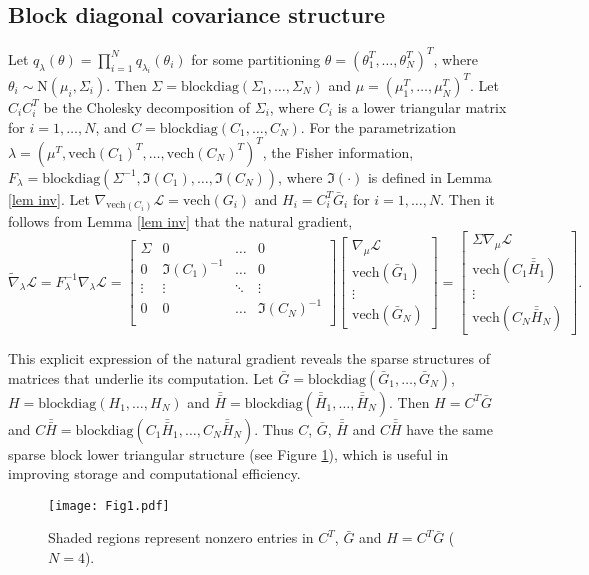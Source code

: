 \documentclass{statsoc}
\newcommand\blockdiag{{\text{blockdiag}}}
\newcommand\mL{{\mathcal{L}}}
\newcommand\N{{\text{N}}}
\newcommand{\vech}{\text{vech}}
\newcommand{\dH}{\bar{\bar{H}}}
\begin{document}
\subsection{Block diagonal covariance structure}
Let $q_\lambda (\theta) = \prod_{i=1}^N q_{\lambda_i} (\theta_i)$ for some partitioning $\theta = (\theta_1^T , \dots, \theta_N^T )^T$, where $\theta_i \sim \N(\mu_i, \Sigma_i)$. Then $\Sigma = \blockdiag(\Sigma_1, \dots, \Sigma_N)$ and $\mu = (\mu_1^T , \dots, \mu_N^T )^T $. Let $C_i C_i^T $ be the Cholesky decomposition of $\Sigma_i$, where $C_i$ is a lower triangular matrix for $i=1, \dots, N$, and $C =  \blockdiag(C_1, \dots, C_N)$. For the parametrization $\lambda = (\mu^T , \vech(C_1)^T , \dots,  \vech(C_N)^T )^T$, the Fisher information, $F_\lambda = \blockdiag(\Sigma^{-1}, \mathfrak{I}(C_1), \dots, \mathfrak{I}(C_N))$, where $\mathfrak{I}(\cdot)$ is defined in Lemma \ref{lem inv}. Let $\nabla_{\vech (C_i)} \mL = \vech(G_i)$ and $H_i = C_i^T  \bar{G}_i$ for $i=1, \dots, N$. Then it follows from Lemma \ref{lem inv} that the natural gradient,
\[
\widetilde{\nabla}_{\lambda} \mL = F_\lambda^{-1} \nabla_\lambda \mL =  \begin{bmatrix}
\Sigma & 0 & \dots & 0 \\
0 & \mathfrak{I}(C_1)^{-1} & \dots & 0 \\
\vdots & \vdots & \ddots & \vdots \\
0 & 0 & \dots & \mathfrak{I}(C_N)^{-1} \\
\end{bmatrix}
\begin{bmatrix} \nabla_\mu \mL \\ \vech(\bar{G}_1)  \\ \vdots \\ \vech(\bar{G}_N) \end{bmatrix}
= \begin{bmatrix} \Sigma \nabla_\mu \mL \\ \vech (C_1 \dH_1) \\  \vdots \\  \vech (C_N \dH_N) \end{bmatrix}.
\]

This explicit expression of the natural gradient reveals the sparse structures of matrices that underlie its computation. Let $\bar{G} = \blockdiag(\bar{G}_1, \dots, \bar{G}_N)$, $H = \blockdiag(H_1, \dots, H_N)$ and $\dH = \blockdiag(\dH_1, \dots, \dH_N)$. Then $H = C^T \bar{G}$ and $C\dH = \blockdiag(C_1 \dH_1, \dots, C_N \dH_N)$. Thus $C$, $\bar{G}$, $\dH$ and $C\dH$ have the same sparse block lower triangular structure (see Figure \ref{Fig1}), which is useful in improving storage and computational efficiency.
\begin{figure}[htb!]
\centering
\texttt{[image: Fig1.pdf]}
\caption{Shaded regions represent nonzero entries in $C^T $, $\bar{G}$ and $H = C^T \bar{G}$ ($N=4$).}
\label{Fig1}
\end{figure}
\end{document}
